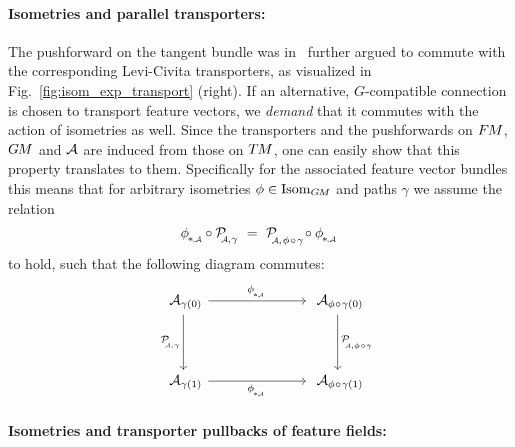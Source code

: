 \paragraph{Isometries and parallel transporters:}
The pushforward on the tangent bundle was in~\cite{gallier2019diffgeom1} further argued to commute with the corresponding Levi-Civita transporters, as visualized in Fig.~\ref{fig:isom_exp_transport} (right).
If an alternative, $G$-compatible connection is chosen to transport feature vectors, we \emph{demand} that it commutes with the action of isometries as well.
Since the transporters and the pushforwards on $F\mkern-1.5muM$, $G\mkern-1.4muM$ and $\mathcal{A}$ are induced from those on $T\mkern-1.5muM$, one can easily show that this property translates to them.
Specifically for the associated feature vector bundles this means that for arbitrary isometries $\phi \in \operatorname{Isom}_{G\mkern-1.4muM}$ and paths $\gamma$ we assume the relation
\begin{align}\label{eq:transport_isom_commutation}
    \dphiA\! \circ \PAgamma
    \ =\ 
    \mathcal{P}_{\mkern-4mu\overset{}{\protect\scalebox{.6}{$\!\A$}, \mkern1.5mu\phi \mkern1.5mu\circ\mkern1.5mu \gamma}}\!
    \circ \dphiA
\end{align}
to hold, such that the following diagram commutes:
\begin{equation}
\quad
\begin{tikzcd}[column sep=70pt, row sep=40, font=\normalsize]
    \A_{\gamma(0)}
        \arrow[r, "\dphiA"]
        \arrow[d, "\PAgamma"']
    &
    \A_{\phi \mkern1mu\circ\mkern1mu \gamma(0)}
        \arrow[d, "\mathcal{P}_{\mkern-4mu\overset{}{\protect\scalebox{.6}{$\!\A$}  \mkern-0mu,\phi \mkern1mu\circ\mkern1mu \gamma}}"]
    \\
    \A_{\gamma(1)}
        \arrow[r, "\dphiA"']
    &
    \A_{\phi \mkern1mu\circ\mkern1mu \gamma(1)}
\end{tikzcd}
\end{equation}






\paragraph{Isometries and transporter pullbacks of feature fields:}

